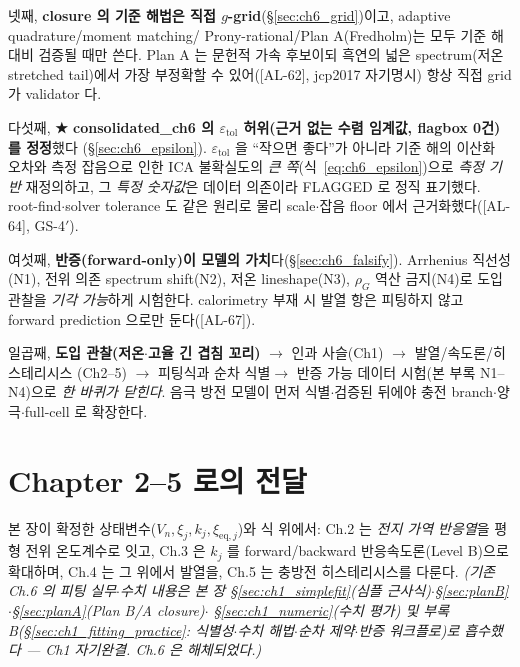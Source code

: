 \documentclass[11pt,a4paper]{article}
\newcommand{\eq}{\mathrm{eq}}
\newcommand{\tol}{\mathrm{tol}}
\newcommand{\AL}[1]{\textsf{[AL-#1]}}
\begin{document}
넷째, \textbf{closure 의 기준 해법은 직접 $g$-grid}(\S\ref{sec:ch6_grid})이고, adaptive quadrature/moment matching/
Prony-rational/Plan A(Fredholm)는 모두 기준 해 대비 검증될 때만 쓴다. Plan A 는 문헌적 가속 후보이되 흑연의 넓은
spectrum(저온 stretched tail)에서 가장 부정확할 수 있어(\AL{62}, jcp2017 자기명시) 항상 직접 grid 가 validator 다.

다섯째, \textbf{★ consolidated\_ch6 의 $\varepsilon_\tol$ 허위(근거 없는 수렴 임계값, flagbox 0건)를 정정}했다
(\S\ref{sec:ch6_epsilon}). $\varepsilon_\tol$ 을 ``작으면 좋다''가 아니라 기준 해의 이산화 오차와 측정 잡음으로
인한 ICA 불확실도의 \emph{큰 쪽}(식~\eqref{eq:ch6_epsilon})으로 \emph{측정 기반} 재정의하고, 그 \emph{특정 숫자값}은
데이터 의존이라 FLAGGED 로 정직 표기했다. root-find$\cdot$solver tolerance 도 같은 원리로 물리 scale$\cdot$잡음
floor 에서 근거화했다(\AL{64}, GS-4$'$).

여섯째, \textbf{반증(forward-only)이 모델의 가치}다(\S\ref{sec:ch6_falsify}). Arrhenius 직선성(N1), 전위 의존
spectrum shift(N2), 저온 lineshape(N3), $\rho_G$ 역산 금지(N4)로 도입 관찰을 \emph{기각 가능}하게 시험한다.
calorimetry 부재 시 발열 항은 피팅하지 않고 forward prediction 으로만 둔다(\AL{67}).

일곱째, \textbf{도입 관찰(저온$\cdot$고율 긴 겹침 꼬리)} $\to$ 인과 사슬(Ch1) $\to$ 발열/속도론/히스테리시스
(Ch2--5) $\to$ 피팅식과 순차 식별$\to$ 반증 가능 데이터 시험(본 부록 N1--N4)으로 \emph{한 바퀴가 닫힌다}. 음극
방전 모델이 먼저 식별$\cdot$검증된 뒤에야 충전 branch$\cdot$양극$\cdot$full-cell 로 확장한다.

\section*{Chapter 2--5 로의 전달}
본 장이 확정한 상태변수($V_n,\xi_j,k_j,\xi_{\eq,j}$)와 식 위에서: Ch.2 는 \emph{전지 가역 반응열}을 평형
전위 온도계수로 잇고, Ch.3 은 $k_j$ 를 forward/backward 반응속도론(Level B)으로 확대하며, Ch.4 는 그 위에서
발열을, Ch.5 는 충방전 히스테리시스를 다룬다. \emph{(기존 Ch.6 의 피팅 실무$\cdot$수치 내용은 본 장
\S\ref{sec:ch1_simplefit}(심플 근사식)$\cdot$\S\ref{sec:planB}$\cdot$\S\ref{sec:planA}(Plan B/A closure)$\cdot$
\S\ref{sec:ch1_numeric}(수치 평가) 및 \emph{부록 B}(\S\ref{sec:ch1_fitting_practice}: 식별성$\cdot$수치 해법$\cdot$순차 제약$\cdot$반증 워크플로)로 흡수했다 — Ch1 자기완결. Ch.6 은 해체되었다.)}
\end{document}
